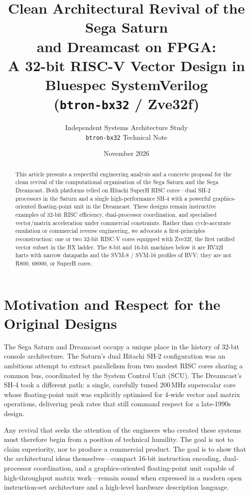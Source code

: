 \documentclass[11pt,a4paper]{article}
\title{\textbf{Clean Architectural Revival of the Sega Saturn\\
and Dreamcast on FPGA:\\
A 32-bit RISC-V Vector Design in Bluespec SystemVerilog\\
(\texttt{btron-bx32} / Zve32f)}}
\author{
  Independent Systems Architecture Study\\
  \texttt{btron-bx32} Technical Note
}
\date{November 2026}
\begin{document}
\maketitle

\begin{abstract}
This article presents a respectful engineering analysis and a concrete proposal for the clean revival of the computational organisation of the Sega Saturn and the Sega Dreamcast. Both platforms relied on Hitachi SuperH RISC cores---dual SH-2 processors in the Saturn and a single high-performance SH-4 with a powerful graphics-oriented floating-point unit in the Dreamcast. These designs remain instructive examples of 32-bit RISC efficiency, dual-processor coordination, and specialised vector/matrix acceleration under commercial constraints. Rather than cycle-accurate emulation or commercial reverse engineering, we advocate a first-principles reconstruction: one or two 32-bit RISC-V cores equipped with Zve32f, the first ratified vector subset in the BX ladder. The 8-bit and 16-bit machines below it are RV32I harts with narrow datapaths and the SVM-8 / SVM-16 profiles of RVV; they are not R800, 68000, or SuperH cores.
\end{abstract}

\section{Motivation and Respect for the Original Designs}

The Sega Saturn and Dreamcast occupy a unique place in the history of 32-bit console architecture. The Saturn's dual Hitachi SH-2 configuration was an ambitious attempt to extract parallelism from two modest RISC cores sharing a common bus, coordinated by the System Control Unit (SCU). The Dreamcast's SH-4 took a different path: a single, carefully tuned 200\,MHz superscalar core whose floating-point unit was explicitly optimised for 4-wide vector and matrix operations, delivering peak rates that still command respect for a late-1990s design.

Any revival that seeks the attention of the engineers who created these systems must therefore begin from a position of technical humility. The goal is not to claim superiority, nor to produce a commercial product. The goal is to show that the architectural ideas themselves---compact 16-bit instruction encoding, dual-processor coordination, and a graphics-oriented floating-point unit capable of high-throughput matrix work---remain sound when expressed in a modern open instruction-set architecture and a high-level hardware description language.
\end{document}
